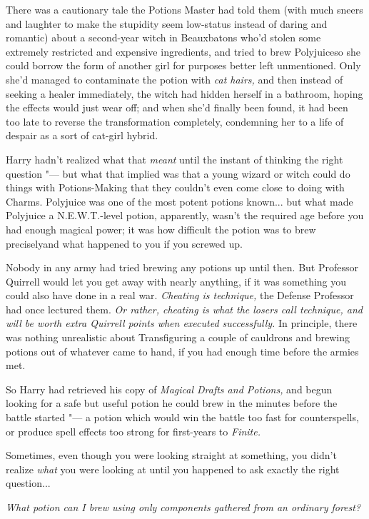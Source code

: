 There was a cautionary tale the Potions Master had told them (with much
sneers and laughter to make the stupidity seem low-status instead of
daring and romantic) about a second-year witch in Beauxbatons who'd
stolen some extremely restricted and expensive ingredients, and tried to
brew Polyjuiceso she could borrow the form of another girl for purposes
better left unmentioned. Only she'd managed to contaminate the potion
with \emph{cat hairs,} and then instead of seeking a healer immediately,
the witch had hidden herself in a bathroom, hoping the effects would
just wear off; and when she'd finally been found, it had been too late
to reverse the transformation completely, condemning her to a life of
despair as a sort of cat-girl hybrid.

Harry hadn't realized what that \emph{meant} until the instant of
thinking the right question "--- but what that implied was that a young
wizard or witch could do things with Potions-Making that they couldn't
even come close to doing with Charms. Polyjuice was one of the most
potent potions known... but what made Polyjuice a N.E.W.T.-level
potion, apparently, wasn't the required age before you had enough
magical power; it was how difficult the potion was to brew preciselyand
what happened to you if you screwed up.

Nobody in any army had tried brewing any potions up until then. But
Professor Quirrell would let you get away with nearly anything, if it
was something you could also have done in a real war. \emph{Cheating is
technique,} the Defense Professor had once lectured them. \emph{Or
rather, cheating is what the losers call technique, and will be worth
extra Quirrell points when executed successfully.} In principle, there
was nothing unrealistic about Transfiguring a couple of cauldrons and
brewing potions out of whatever came to hand, if you had enough time
before the armies met.

So Harry had retrieved his copy of \emph{Magical Drafts and Potions,}
and begun looking for a safe but useful potion he could brew in the
minutes before the battle started "--- a potion which would win the battle
too fast for counterspells, or produce spell effects too strong for
first-years to \emph{Finite.}

Sometimes, even though you were looking straight at something, you
didn't realize \emph{what} you were looking at until you happened to ask
exactly the right question...

\emph{What potion can I brew using only components gathered from an
ordinary forest?}

